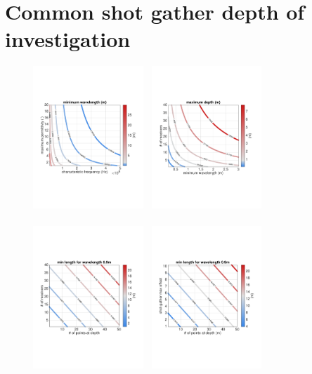 \documentclass[a4paper,12pt]{article}
\begin{document}
\section{Common shot gather depth of investigation}
%
%
\begin{figure}[!h]
\centering
\includegraphics[trim={20 170 30 180},clip,width=0.37\textwidth]{../pics/min-wavelength.pdf}~
\includegraphics[trim={20 170 30 180},clip,width=0.37\textwidth]{../pics/depth-w.pdf}\\~\\
\includegraphics[trim={20 170 30 180},clip,width=0.37\textwidth]{../pics/min-length-wavelength-09m-recs.pdf}~
\includegraphics[trim={20 170 30 180},clip,width=0.37\textwidth]{../pics/min-length-wavelength-09m.pdf}

\end{figure}
\end{document}
